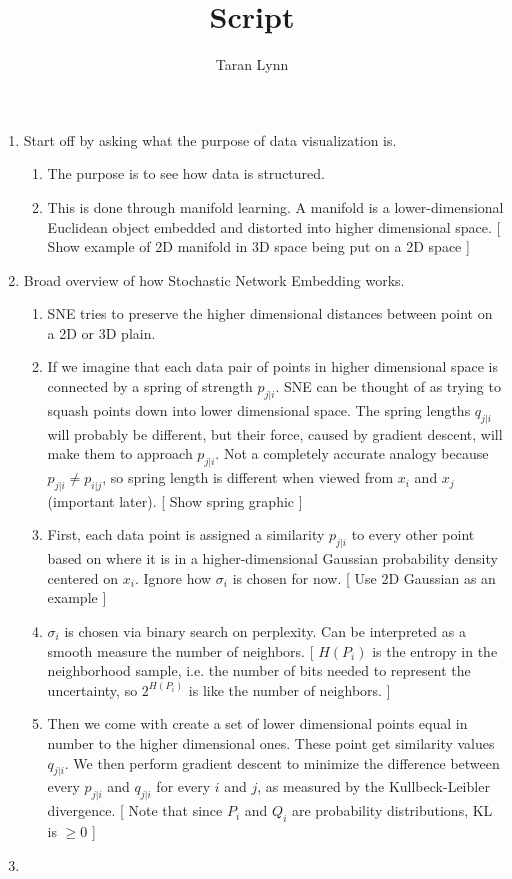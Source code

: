 \documentclass[12pt]{article}
\title{Script}
\author{Taran Lynn}
\date{}
\begin{document}
\maketitle

\begin{enumerate}
\item Start off by asking what the purpose of data visualization is.
  \begin{enumerate}
  \item The purpose is to see how data is structured.

  \item This is done through manifold learning.
    A manifold is a lower-dimensional Euclidean object embedded and
    distorted into higher dimensional space.
    [ Show example of 2D manifold in 3D space being put on a 2D space ]
  \end{enumerate}
  
\item Broad overview of how Stochastic Network Embedding works.
  \begin{enumerate}
  \item SNE tries to preserve the higher dimensional distances
    between point on a 2D or 3D plain.
    
  \item If we imagine that each data pair of points in higher
    dimensional space is connected by a spring of strength $p_{j|i}$.
    SNE can be thought of as trying to squash points down into lower
    dimensional space.
    The spring lengths $q_{j|i}$ will probably be different, but their
    force, caused by gradient descent, will make them to approach
    $p_{j|i}$.
    Not a completely accurate analogy because $p_{j|i} \neq p_{i|j}$,
    so spring length is different when viewed from $x_i$ and $x_j$
    (important later).
    [ Show spring graphic ]

  \item First, each data point is assigned a similarity $p_{j|i}$ to
    every other point based on where it is in a higher-dimensional
    Gaussian probability density centered on $x_i$.
    Ignore how $\sigma_i$ is chosen for now.
    [ Use 2D Gaussian as an example ]

  \item $\sigma_i$ is chosen via binary search on perplexity.
    Can be interpreted as a smooth measure the number of neighbors.
    [ $H(P_i)$ is the entropy in the neighborhood sample, i.e. the
    number of bits needed to represent the uncertainty, so $2^{H(P_i)}$ is
    like the number of neighbors. ]

  \item Then we come with create a set of lower dimensional points
    equal in number to the higher dimensional ones.
    These point get similarity values $q_{j|i}$.
    We then perform gradient descent to minimize the difference
    between every $p_{j|i}$ and $q_{j|i}$ for every $i$ and $j$, as
    measured by the Kullbeck-Leibler divergence.
    [ Note that since $P_i$ and $Q_i$ are probability distributions, KL is $\ge 0$ ]
  \end{enumerate}

\item {}
\end{enumerate}
\end{document}
